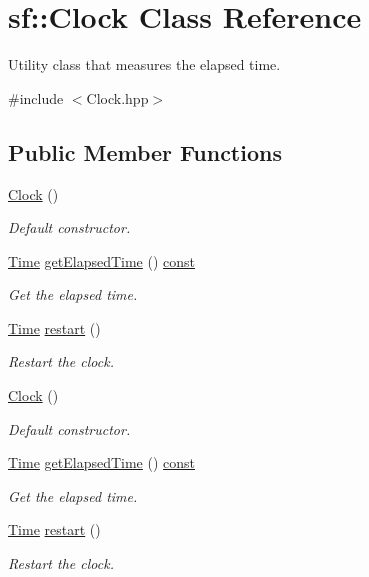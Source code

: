 \hypertarget{classsf_1_1_clock}{\section{sf\-:\-:Clock Class Reference}
\label{classsf_1_1_clock}
}


Utility class that measures the elapsed time.  




{\ttfamily \#include $<$Clock.\-hpp$>$}

\subsection*{Public Member Functions}
\begin{DoxyCompactItemize}
\item 
\hyperlink{classsf_1_1_clock_abbc959c7830ca7c3a4da133cb506d3fd}{Clock} ()
\begin{DoxyCompactList}\small\item\em Default constructor. \end{DoxyCompactList}\item 
\hyperlink{classsf_1_1_time}{Time} \hyperlink{classsf_1_1_clock_a799feb6acb099b57b58d8d20984fce11}{get\-Elapsed\-Time} () \hyperlink{term__entry_8h_a57bd63ce7f9a353488880e3de6692d5a}{const} 
\begin{DoxyCompactList}\small\item\em Get the elapsed time. \end{DoxyCompactList}\item 
\hyperlink{classsf_1_1_time}{Time} \hyperlink{classsf_1_1_clock_a123e2627f2943e5ecaa1db0c7df3231b}{restart} ()
\begin{DoxyCompactList}\small\item\em Restart the clock. \end{DoxyCompactList}\item 
\hyperlink{classsf_1_1_clock_abbc959c7830ca7c3a4da133cb506d3fd}{Clock} ()
\begin{DoxyCompactList}\small\item\em Default constructor. \end{DoxyCompactList}\item 
\hyperlink{classsf_1_1_time}{Time} \hyperlink{classsf_1_1_clock_a799feb6acb099b57b58d8d20984fce11}{get\-Elapsed\-Time} () \hyperlink{term__entry_8h_a57bd63ce7f9a353488880e3de6692d5a}{const} 
\begin{DoxyCompactList}\small\item\em Get the elapsed time. \end{DoxyCompactList}\item 
\hyperlink{classsf_1_1_time}{Time} \hyperlink{classsf_1_1_clock_a123e2627f2943e5ecaa1db0c7df3231b}{restart} ()
\begin{DoxyCompactList}\small\item\em Restart the clock. \end{DoxyCompactList}\end{DoxyCompactItemize}



